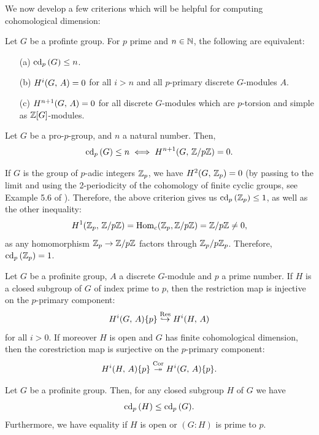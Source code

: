 \documentclass[a4paper, oneside]{memoir}
\begin{document}
We now develop a few criterions which will be helpful for computing cohomological dimension:

\begin{theorem}
	Let $G$ be a profinte group. For $p$ prime and $n\in\mathbb{N}$, the following are equivalent:
	\begin{itemize}
		\item[(a)] $\operatorname{cd}_p{(G)}\leq n$.
		\item[(b)] $H^{i}( G, \, A )=0$ for all $i>n$ and all $p$-primary discrete $G$-modules $A$.
		\item[(c)] $H^{n+1}( G, \, A )=0$ for all discrete $G$-modules which are $p$-torsion and simple as $\mathbb{Z}[G]$-modules.
	\end{itemize}
\end{theorem}

\begin{theorem}
	Let $G$ be a pro-$p$-group, and $n$ a natural number. Then,
	\[
		\operatorname{cd}_p{(G)}\leq n \iff H^{n+1}( G, \, \mathbb{Z}/{p\mathbb{Z}} )=0
		.\]
\end{theorem}

\begin{example}\label{ex:Zp}
	If $G$ is the group of $p$-adic integers $\mathbb{Z}_p$, we have $H^{2}( G, \, \mathbb{Z}_p )=0$ (by passing to the limit and using the 2-periodicity of the cohomology of finite cyclic groups, see Example 5.6 of \cite{Harari}). Therefore, the above criterion gives us $\operatorname{cd}_p{(\mathbb{Z}_p)}\leq 1$, as well as the other inequality:
	\[
		H^{1}( \mathbb{Z}_p, \, \mathbb{Z}/{p\mathbb{Z}} )=\operatorname{Hom}_{c}(\mathbb{Z}_p,\mathbb{Z}/{p\mathbb{Z}})=\mathbb{Z}/p\mathbb{Z}\neq0,
	\]
	as any homomorphism $\mathbb{Z}_p\to\mathbb{Z}/{p\mathbb{Z}}$ factors through $\mathbb{Z}_p/{p\mathbb{Z}_p}$. Therefore, $\operatorname{cd}_p{(\mathbb{Z}_p)}=1$.
\end{example}

\begin{lemma}
	Let $G$ be a profinite group, $A$ a discrete $G$-module and $p$ a prime number. If $H$ is a closed subgroup of $G$ of index prime to $p$, then the restriction map is injective on the $p$-primary component:
	\[
		H^{i}( G, \, A )\{p\}\overset{\operatorname{Res}}{\hookrightarrow}H^{i}( H, \, A )
	\]
	for all $i>0$.
	If moreover $H$ is open and $G$ has finite cohomological dimension, then the corestriction map is surjective on the $p$-primary component:
	\[
		H^{i}( H, \, A )\{p\}\overset{\operatorname{Cor}}{\twoheadrightarrow}H^{i}( G, \, A )\{p\}.
	\]
\end{lemma}

\begin{proposition}\label{prop:CdSgr}
	Let $G$ be a profinite group. Then, for any closed subgroup $H$ of $G$ we have
	\[
		\operatorname{cd}_p{(H)}\leq \operatorname{cd}_p{(G)}.
	\]
	Furthermore, we have equality if $H$ is open or $(G:H)$ is prime to $p$.
\end{proposition}
\end{document}
